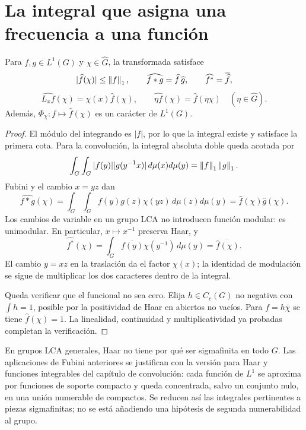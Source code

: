 \section{La integral que asigna una frecuencia a una función}
\begin{proposicion}\label{v4:fourier-identidades-lca}
Para $f,g\in L^1(G)$ y $\chi\in\widehat G$, la transformada satisface
\[
 |\widehat f(\chi)|\le\left\lVert f\right\rVert_1,\qquad
 \widehat{f*g}=\widehat f\,\widehat g,\qquad
 \widehat{f^*}=\overline{\widehat f},
\]
\[
 \widehat{L_xf}(\chi)=\chi(x)\widehat f(\chi),\qquad
 \widehat{\eta f}(\chi)=\widehat f(\eta\chi)\quad(\eta\in\widehat G).
\]
Además, $\Phi_\chi:f\mapsto\widehat f(\chi)$ es un carácter de $L^1(G)$.
\end{proposicion}
\begin{proof}
El módulo del integrando es $|f|$, por lo que la integral existe y satisface la primera cota. Para la convolución, la integral absoluta doble queda acotada por
\[
 \int_G\int_G|f(y)||g(y^{-1}x)|\,d\mu(x)d\mu(y)
 =\left\lVert f\right\rVert_1\left\lVert g\right\rVert_1.
\]
Fubini y el cambio $x=yz$ dan
\[
 \widehat{f*g}(\chi)=\int_G\int_Gf(y)g(z)\chi(yz)\,d\mu(z)d\mu(y)
 =\widehat f(\chi)\widehat g(\chi).
\]
Los cambios de variable en un grupo LCA no introducen función modular: es unimodular. En particular, $x\mapsto x^{-1}$ preserva Haar, y
\[
 \widehat{f^*}(\chi)=\int_G\overline{f(y)}\chi(y^{-1})\,d\mu(y)
 =\overline{\widehat f(\chi)}.
\]
El cambio $y=xz$ en la traslación da el factor $\chi(x)$; la identidad de modulación se sigue de multiplicar los dos caracteres dentro de la integral.

Queda verificar que el funcional no sea cero. Elija $h\in C_c(G)$ no negativa con $\int h=1$, posible por la positividad de Haar en abiertos no vacíos. Para $f=h\overline\chi$ se tiene $\widehat f(\chi)=1$. La linealidad, continuidad y multiplicatividad ya probadas completan la verificación.
\end{proof}

En grupos LCA generales, Haar no tiene por qué ser sigmafinita en todo $G$. Las aplicaciones de Fubini anteriores se justifican con la versión para Haar y funciones integrables del capítulo de convolución: cada función de $L^1$ se aproxima por funciones de soporte compacto y queda concentrada, salvo un conjunto nulo, en una unión numerable de compactos. Se reducen así las integrales pertinentes a piezas sigmafinitas; no se está añadiendo una hipótesis de segunda numerabilidad al grupo.

